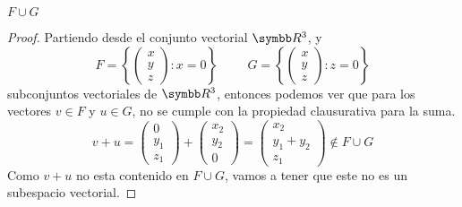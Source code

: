     \begin{mathcase}{\(F \cup G\)}
        \begin{proof}
            Partiendo desde el conjunto vectorial \(\realR^3\), y 
            \[
                F = 
                \left\{
                    \begin{pmatrix}
                        x \\ y \\ z
                    \end{pmatrix}
                    :
                    x = 0
                \right\}
                \hspace{1cm}
                G = 
                \left\{
                    \begin{pmatrix}
                        x \\ y \\ z
                    \end{pmatrix}
                    :
                    z = 0
                \right\}
            \]
            subconjuntos vectoriales de \(\realR^3\), entonces podemos ver que para los vectores \(v \in F\) y \(u \in G\),
            no se cumple con la propiedad clausurativa para la suma.
            \[
                v + u =
                \begin{pmatrix}
                    0 \\ y_1 \\ z_1
                \end{pmatrix}
                +
                \begin{pmatrix}
                    x_2 \\ y_2 \\ 0
                \end{pmatrix}
                =
                \begin{pmatrix}
                    x_2 \\ y_1 + y_2 \\ z_1
                \end{pmatrix}
                \not\in F \cup G
            \]
            Como \(v + u\) no esta contenido en \(F \cup G\), vamos a tener que este no es un subespacio vectorial.
        \end{proof}
    \end{mathcase}
